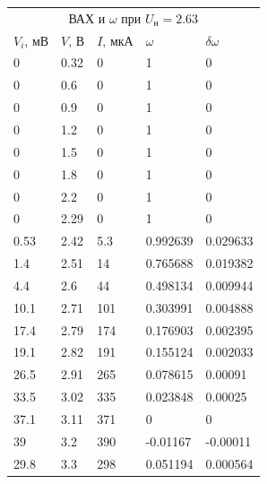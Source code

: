 \documentclass[%
 reprint,
 amsmath,amssymb,
 aps,
]{revtex4-2}
\begin{document}
\begin{table}[h!]
	\begin{tabular}{|l|l|l|l|l|}
		\hline
		\multicolumn{5}{|c|}{\multirow{2}{*}{ВАХ и $\omega$ при $U_\text{н} = 2.63$}} \\
		\multicolumn{5}{|c|}{}                                       \\ \hline
		$V_i$, мВ    & $V$, В     & $I$, мкА    & $\omega$           & $\delta\omega$          \\ \hline
		0         & 0.32     & 0         & 1           & 0           \\ \hline
		0         & 0.6      & 0         & 1           & 0           \\ \hline
		0         & 0.9      & 0         & 1           & 0           \\ \hline
		0         & 1.2      & 0         & 1           & 0           \\ \hline
		0         & 1.5      & 0         & 1           & 0           \\ \hline
		0         & 1.8      & 0         & 1           & 0           \\ \hline
		0         & 2.2      & 0         & 1           & 0           \\ \hline
		0         & 2.29     & 0         & 1           & 0           \\ \hline
		0.53      & 2.42     & 5.3       & 0.992639    & 0.029633    \\ \hline
		1.4       & 2.51     & 14        & 0.765688    & 0.019382    \\ \hline
		4.4       & 2.6      & 44        & 0.498134    & 0.009944    \\ \hline
		10.1      & 2.71     & 101       & 0.303991    & 0.004888    \\ \hline
		17.4      & 2.79     & 174       & 0.176903    & 0.002395    \\ \hline
		19.1      & 2.82     & 191       & 0.155124    & 0.002033    \\ \hline
		26.5      & 2.91     & 265       & 0.078615    & 0.00091     \\ \hline
		33.5      & 3.02     & 335       & 0.023848    & 0.00025     \\ \hline
		37.1      & 3.11     & 371       & 0           & 0           \\ \hline
		39        & 3.2      & 390       & -0.01167    & -0.00011    \\ \hline
		29.8      & 3.3      & 298       & 0.051194    & 0.000564    \\ \hline

\end{tabular}
\end{table}
\end{document}
